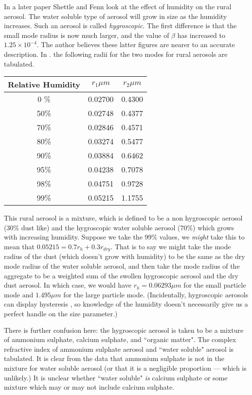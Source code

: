 \documentclass[12pt]{article}
\begin{document}
In a later paper Shettle and Fenn \cite{ShettleFenn2:Mybib} look at the effect of humidity on the rural aerosol.
The water soluble type of aerosol will grow in size as the humidity increases.
Such an aerosol is called {\it hygroscopic}.
The first difference is that the small mode radius is now much larger,  and the value
of $\beta$ has increased to $1.25 \times 10^{-4}$. The author believes these latter figures are
 nearer to an accurate description. 
 In \cite{ShettleFenn2:Mybib}. the following radii for the two modes for rural aerosols are 
tabulated.
\begin{center}
\begin{tabular}{| c | c | c | }
\hline
Relative Humidity&  $r_1 \mu m$ & $r_2 \mu m$ \\
\hline
 0 \% &  0.02700 & 0.4300 \\
 50\% &  0.02748 & 0.4377 \\
 70\% &  0.02846 & 0.4571 \\
 80\% &  0.03274 & 0.5477 \\
 90\% &  0.03884 & 0.6462 \\
 95\% &  0.04238 & 0.7078 \\
 98\% &  0.04751 & 0.9728 \\
 99\% &  0.05215 & 1.1755 \\
\hline
\end{tabular}
\end{center}
This rural aerosol is a mixture, which is defined to be a non
 hygroscopic aerosol (30\% dust like) and the hygroscopic water soluble aerosol
(70\%) which grows with increasing humidity.
 Suppose we  take the 99\% values, we {\it might}  take this to mean that
 $0.05215=0.7 r_h+0.3 r_{dry}$. That is to say we might take the mode 
radius of the dust (which doesn't grow with humidity) to be the same
 as the dry mode radius
of the water soluble aerosol, and then take the mode radius of the aggregate
to be a weighted sum of the swollen hygroscopic aerosol and the dry dust aerosol.
 In which case, we would have $r_h=0.06293 \mu m$
for the small particle mode
 and $1.495 \mu m$
for the large particle mode. (Incidentally, hygroscopic aerosols can display
hysteresis \cite{Samparta:Mybib}, so knowledge of the humidity doesn't necessarily give
us a perfect handle on the size parameter.)

There is further confusion here: the hygroscopic aerosol is taken to be a mixture
 of ammonium sulphate, calcium sulphate, and ``organic matter". The complex
refractive index of ammonium sulphate aerosol and ``water soluble" aerosol is tabulated.
It is clear from the data that ammonium sulphate is not in the mixture for water
soluble aerosol (or that it is a negligible proportion --- which is unlikely.)
It is unclear whether ``water soluble" {\it is} calcium sulphate or some mixture
which may or may not include calcium sulphate.
\end{document}
